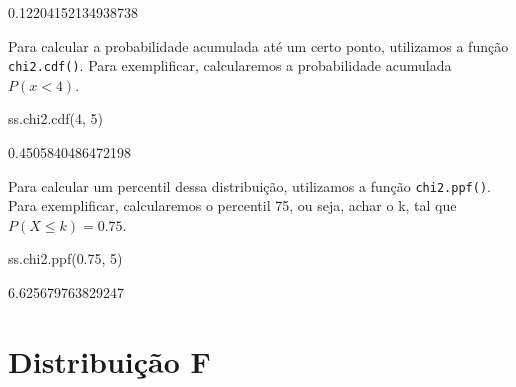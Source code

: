 \documentclass[
  letterpaper,
  DIV=11,
  numbers=noendperiod]{scrreprt}
\newenvironment{Shaded}{\begin{snugshade}}{\end{snugshade}}
\newcommand{\DecValTok}[1]{\textcolor[rgb]{0.68,0.00,0.00}{#1}}
\newcommand{\FloatTok}[1]{\textcolor[rgb]{0.68,0.00,0.00}{#1}}
\newcommand{\NormalTok}[1]{\textcolor[rgb]{0.00,0.23,0.31}{#1}}
\begin{document}
\begin{tcolorbox}[enhanced jigsaw, breakable, leftrule=.75mm, left=2mm, opacityback=0, bottomrule=.15mm, toprule=.15mm, rightrule=.15mm, arc=.35mm, colback=white]

0.12204152134938738

\end{tcolorbox}

Para calcular a probabilidade acumulada até um certo ponto, utilizamos a
função \texttt{chi2.cdf()}. Para exemplificar, calcularemos a
probabilidade acumulada \(P(x < 4)\).

\begin{Shaded}
\begin{Highlighting}[]
\NormalTok{ss.chi2.cdf(}\DecValTok{4}\NormalTok{, }\DecValTok{5}\NormalTok{)}
\end{Highlighting}
\end{Shaded}

\begin{tcolorbox}[enhanced jigsaw, breakable, leftrule=.75mm, left=2mm, opacityback=0, bottomrule=.15mm, toprule=.15mm, rightrule=.15mm, arc=.35mm, colback=white]

0.4505840486472198

\end{tcolorbox}

Para calcular um percentil dessa distribuição, utilizamos a função
\texttt{chi2.ppf()}. Para exemplificar, calcularemos o percentil 75, ou
seja, achar o k, tal que \(P(X ≤ k) = 0.75\).

\begin{Shaded}
\begin{Highlighting}[]
\NormalTok{ss.chi2.ppf(}\FloatTok{0.75}\NormalTok{, }\DecValTok{5}\NormalTok{)}
\end{Highlighting}
\end{Shaded}

\begin{tcolorbox}[enhanced jigsaw, breakable, leftrule=.75mm, left=2mm, opacityback=0, bottomrule=.15mm, toprule=.15mm, rightrule=.15mm, arc=.35mm, colback=white]

6.625679763829247

\end{tcolorbox}


\hypertarget{distribuiuxe7uxe3o-f}{%
\chapter{Distribuição F}\label{distribuiuxe7uxe3o-f}}
\end{document}
